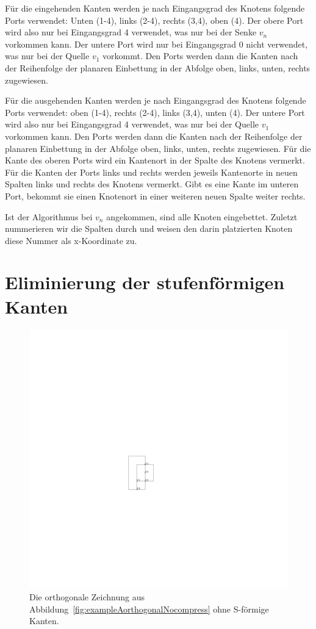 \documentclass[a4paper]{scrreprt}
\theoremstyle{definition}
\begin{document}
Für die eingehenden Kanten werden je nach Eingangsgrad des Knotens folgende Ports verwendet: Unten (1-4), links (2-4), rechts (3,4), oben (4). Der obere Port wird also nur bei Eingangsgrad 4 verwendet, was nur bei der Senke $v_n$ vorkommen kann. Der untere Port wird nur bei Eingangsgrad 0 nicht verwendet, was nur bei der Quelle $v_1$ vorkommt. Den Ports werden dann die Kanten nach der Reihenfolge der planaren Einbettung in der Abfolge oben, links, unten, rechts zugewiesen.

Für die ausgehenden Kanten werden je nach Eingangsgrad des Knotens folgende Ports verwendet: oben (1-4), rechts (2-4), links (3,4), unten (4). Der untere Port wird also nur bei Eingangsgrad 4 verwendet, was nur bei der Quelle $v_1$ vorkommen kann. Den Ports werden dann die Kanten nach der Reihenfolge der planaren Einbettung in der Abfolge oben, links, unten, rechts zugewiesen. 
Für die Kante des oberen Ports wird ein Kantenort in der Spalte des Knotens vermerkt. Für die Kanten der Ports links und rechts werden jeweils Kantenorte in neuen Spalten links und rechts des Knotens vermerkt. Gibt es eine Kante im unteren Port, bekommt sie einen Knotenort in einer weiteren neuen Spalte weiter rechts. %

Ist der Algorithmus bei $v_n$ angekommen, sind alle Knoten eingebettet. Zuletzt nummerieren wir die Spalten durch und weisen den darin platzierten Knoten diese Nummer als x-Koordinate zu. 

\section{Eliminierung der stufenförmigen Kanten}

\begin{figure}[h]
  \centering
  \includegraphics{exampleA_orthogonalCompress}
  \caption{Die orthogonale Zeichnung aus Abbildung~\ref{fig:exampleAorthogonalNocompress} ohne S-förmige Kanten.}
  \label{fig:exampleAorthogonalCompress}
\end{figure}
\end{document}

